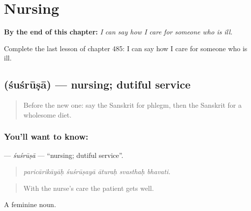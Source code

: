 
\chapter{Nursing}
\label{ch:sa-nursing}

\begin{chapteropening}
\textbf{By the end of this chapter:} \emph{I can say how I care for someone who is ill.}

Complete the last lesson of chapter 485: I can say how I care for someone who is ill.
\end{chapteropening}

\section[\texorpdfstring{\sk{शुश्रूषा} (śuśrūṣā)}{शुश्रूषा (śuśrūṣā)}]{ (śuśrūṣā) — nursing; dutiful service}

\label{lesson:SA-C485-susrusa}



\begin{quote}
Before the new one: say the Sanskrit for phlegm, then the Sanskrit for a wholesome diet.
\end{quote}

\subsection*{You'll want to know: }
\textbf{} — \emph{śuśrūṣā} — \textquotedblleft{}nursing; dutiful service\textquotedblright{}.

\begin{quote}
    
\end{quote}

\begin{quote}
\emph{paricārikāyāḥ śuśrūṣayā āturaḥ svasthaḥ bhavati.}
\end{quote}

\begin{quote}
With the nurse's care the patient gets well.
\end{quote}

A feminine noun.

